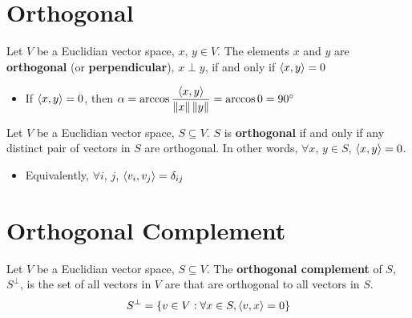 \documentclass[letterpaper,12pt]{article}
\begin{document}
\section*{Orthogonal}
\begin{definition}
Let $V$ be a Euclidian vector space, $x$, $y \in V$. The elements $x$ and $y$ are \textbf{orthogonal} (or \textbf{perpendicular}), $x \perp y$, if and only if $\left< x, y \right> = 0$

\begin{itemize}
    \item If $\left< x, y \right> = 0$, then $\alpha = \arccos{\dfrac{\left< x, y \right>}{\left\lVert x \right\rVert \left\lVert y \right\rVert}} = \arccos{0} = \ang{90}$
\end{itemize}
\end{definition}

\begin{definition}
Let $V$ be a Euclidian vector space, $S \subseteq V$. $S$ is \textbf{orthogonal} if and only if any distinct pair of vectors in $S$ are orthogonal. In other words, $\forall x$, $y \in S$, $\left< x, y \right> = 0$.
\begin{itemize}
    \item Equivalently, $\forall i$, $j$, $\left< v_i, v_j \right> = \delta_{ij}$
\end{itemize}
\end{definition}

\section*{Orthogonal Complement}
\begin{definition}
Let $V$ be a Euclidian vector space, $S \subseteq V$. The \textbf{orthogonal complement} of $S$, $S^{\perp}$, is the set of all vectors in $V$ are that are orthogonal to all vectors in $S$.
\begin{equation*}
    S^{\perp} = \left\{ v \in V: \forall x \in S, \left< v, x \right> = 0 \right\}
\end{equation*}
\end{definition}
\end{document}
